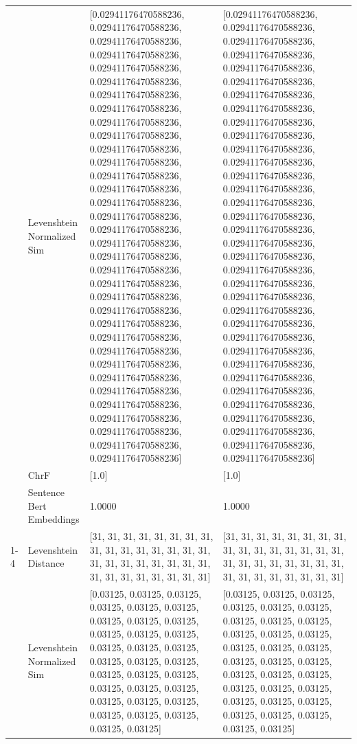 \begin{tabular}{llll}
 & Levenshtein Normalized Sim & [0.02941176470588236, 0.02941176470588236, 0.02941176470588236, 0.02941176470588236, 0.02941176470588236, 0.02941176470588236, 0.02941176470588236, 0.02941176470588236, 0.02941176470588236, 0.02941176470588236, 0.02941176470588236, 0.02941176470588236, 0.02941176470588236, 0.02941176470588236, 0.02941176470588236, 0.02941176470588236, 0.02941176470588236, 0.02941176470588236, 0.02941176470588236, 0.02941176470588236, 0.02941176470588236, 0.02941176470588236, 0.02941176470588236, 0.02941176470588236, 0.02941176470588236, 0.02941176470588236, 0.02941176470588236, 0.02941176470588236, 0.02941176470588236, 0.02941176470588236, 0.02941176470588236, 0.02941176470588236, 0.02941176470588236, 0.02941176470588236] & [0.02941176470588236, 0.02941176470588236, 0.02941176470588236, 0.02941176470588236, 0.02941176470588236, 0.02941176470588236, 0.02941176470588236, 0.02941176470588236, 0.02941176470588236, 0.02941176470588236, 0.02941176470588236, 0.02941176470588236, 0.02941176470588236, 0.02941176470588236, 0.02941176470588236, 0.02941176470588236, 0.02941176470588236, 0.02941176470588236, 0.02941176470588236, 0.02941176470588236, 0.02941176470588236, 0.02941176470588236, 0.02941176470588236, 0.02941176470588236, 0.02941176470588236, 0.02941176470588236, 0.02941176470588236, 0.02941176470588236, 0.02941176470588236, 0.02941176470588236, 0.02941176470588236, 0.02941176470588236, 0.02941176470588236, 0.02941176470588236] \\
 & ChrF & [1.0] & [1.0] \\
 & Sentence Bert Embeddings & 1.0000 & 1.0000 \\
\cline{1-4}
\multirow[t]{4}{*}{Omwana omuya nigo ogosara rigesa.} & Levenshtein Distance & [31, 31, 31, 31, 31, 31, 31, 31, 31, 31, 31, 31, 31, 31, 31, 31, 31, 31, 31, 31, 31, 31, 31, 31, 31, 31, 31, 31, 31, 31, 31, 31] & [31, 31, 31, 31, 31, 31, 31, 31, 31, 31, 31, 31, 31, 31, 31, 31, 31, 31, 31, 31, 31, 31, 31, 31, 31, 31, 31, 31, 31, 31, 31, 31] \\
 & Levenshtein Normalized Sim & [0.03125, 0.03125, 0.03125, 0.03125, 0.03125, 0.03125, 0.03125, 0.03125, 0.03125, 0.03125, 0.03125, 0.03125, 0.03125, 0.03125, 0.03125, 0.03125, 0.03125, 0.03125, 0.03125, 0.03125, 0.03125, 0.03125, 0.03125, 0.03125, 0.03125, 0.03125, 0.03125, 0.03125, 0.03125, 0.03125, 0.03125, 0.03125] & [0.03125, 0.03125, 0.03125, 0.03125, 0.03125, 0.03125, 0.03125, 0.03125, 0.03125, 0.03125, 0.03125, 0.03125, 0.03125, 0.03125, 0.03125, 0.03125, 0.03125, 0.03125, 0.03125, 0.03125, 0.03125, 0.03125, 0.03125, 0.03125, 0.03125, 0.03125, 0.03125, 0.03125, 0.03125, 0.03125, 0.03125, 0.03125] \\

\end{tabular}
